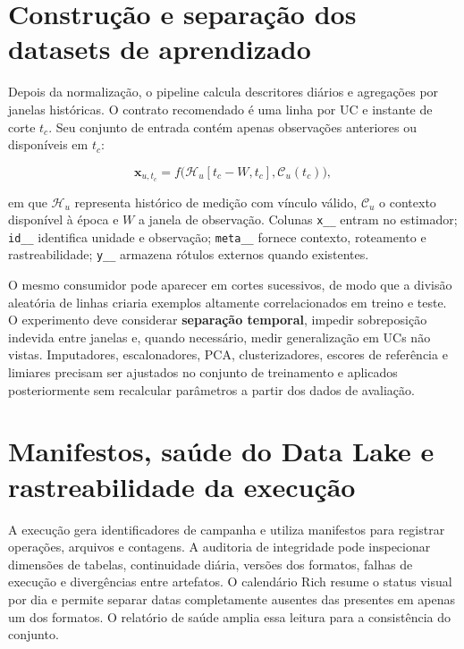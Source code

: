 \section{Construção e separação dos datasets de aprendizado}\label{construuxe7uxe3o-e-separauxe7uxe3o-dos-datasets-de-aprendizado}

Depois da normalização, o pipeline calcula descritores diários e agregações por janelas históricas. O contrato recomendado é uma linha por UC e instante de corte \(t_c\). Seu conjunto de entrada contém apenas observações anteriores ou disponíveis em \(t_c\):

\[\mathbf{x}_{u,t_c}=f\big(\mathcal H_u[t_c-W,t_c],\mathcal C_u(t_c)\big),\]

em que \(\mathcal H_u\) representa histórico de medição com vínculo válido, \(\mathcal C_u\) o contexto disponível à época e \(W\) a janela de observação. Colunas \texttt{x\_\_} entram no estimador; \texttt{id\_\_} identifica unidade e observação; \texttt{meta\_\_} fornece contexto, roteamento e rastreabilidade; \texttt{y\_\_} armazena rótulos externos quando existentes.

O mesmo consumidor pode aparecer em cortes sucessivos, de modo que a divisão aleatória de linhas criaria exemplos altamente correlacionados em treino e teste. O experimento deve considerar \textbf{separação temporal}, impedir sobreposição indevida entre janelas e, quando necessário, medir generalização em UCs não vistas. Imputadores, escalonadores, PCA, clusterizadores, escores de referência e limiares precisam ser ajustados no conjunto de treinamento e aplicados posteriormente sem recalcular parâmetros a partir dos dados de avaliação.

\section{Manifestos, saúde do Data Lake e rastreabilidade da execução}\label{manifestos-sauxfade-do-data-lake-e-rastreabilidade-da-execuuxe7uxe3o}

A execução gera identificadores de campanha e utiliza manifestos para registrar operações, arquivos e contagens. A auditoria de integridade pode inspecionar dimensões de tabelas, continuidade diária, versões dos formatos, falhas de execução e divergências entre artefatos. O calendário Rich resume o status visual por dia e permite separar datas completamente ausentes das presentes em apenas um dos formatos. O relatório de saúde amplia essa leitura para a consistência do conjunto.

